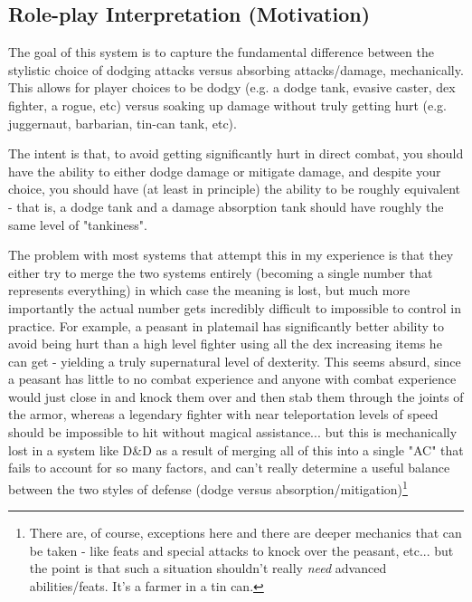 \documentclass{article}
\begin{document}
    \subsection{Role-play Interpretation (Motivation)}
        The goal of this system is to capture the fundamental difference between the stylistic choice of dodging attacks versus absorbing attacks/damage, mechanically. This allows for player choices to be dodgy (e.g. a dodge tank, evasive caster, dex fighter, a rogue, etc) versus soaking up damage without truly getting hurt (e.g. juggernaut, barbarian, tin-can tank, etc).
        
        The intent is that, to avoid getting significantly hurt in direct combat, you should have the ability to either dodge damage or mitigate damage, and despite your choice, you should have (at least in principle) the ability to be roughly equivalent - that is, a dodge tank and a damage absorption tank should have roughly the same level of "tankiness".
        
        The problem with most systems that attempt this in my experience is that they either try to merge the two systems entirely (becoming a single number that represents everything) in which case the meaning is lost, but much more importantly the actual number gets incredibly difficult to impossible to control in practice. For example, a peasant in platemail has significantly better ability to avoid being hurt than a high level fighter using all the dex increasing items he can get - yielding a truly supernatural level of dexterity. This seems absurd, since a peasant has little to no combat experience and anyone with combat experience would just close in and knock them over and then stab them through the joints of the armor, whereas a legendary fighter with near teleportation levels of speed should be impossible to hit without magical assistance... but this is mechanically lost in a system like D\&D as a result of merging all of this into a single "AC" that fails to account for so many factors, and can't really determine a useful balance between the two styles of defense (dodge versus absorption/mitigation)\footnote{There are, of course, exceptions here and there are deeper mechanics that can be taken - like feats and special attacks to knock over the peasant, etc... but the point is that such a situation shouldn't really \emph{need} advanced abilities/feats. It's a farmer in a tin can.}
        
\end{document}
